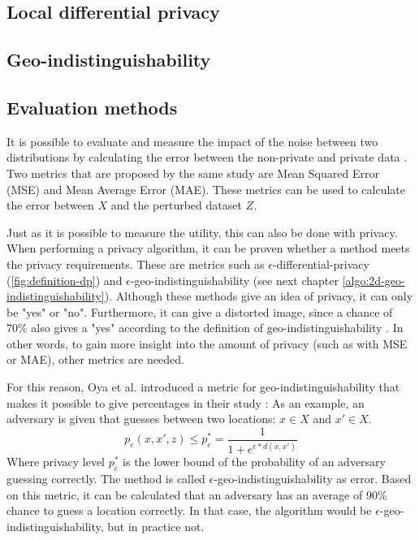 \subsection{Local differential privacy}
\subsection{Geo-indistinguishability}

\subsection{Evaluation methods} \label{theory:evaluation-dp}
It is possible to evaluate and measure the impact of the noise between two distributions by calculating the error between the non-private and private data \citep{del_rey_comprehensive_2020-1}.
Two metrics that are proposed by the same study are Mean Squared Error (MSE) and Mean Average Error (MAE).
These metrics can be used to calculate the error between $X$ and the perturbed dataset $Z$. \newline

Just as it is possible to measure the utility, this can also be done with privacy.
When performing a privacy algorithm, it can be proven whether a method meets the privacy requirements.
These are metrics such as $\epsilon$-differential-privacy (\ref{fig:definition-dp}) and $\epsilon$-geo-indistinguishability (see next chapter \ref{algo:2d-geo-indistinguishability}).
Although these methods give an idea of privacy, it can only be "yes" or "no".
Furthermore, it can give a distorted image, since a chance of 70\% also gives a "yes" according to the definition of geo-indistinguishability \citep{oya_is_2017}.
In other words, to gain more insight into the amount of privacy (such as with MSE or MAE), other metrics are needed.

For this reason, Oya et al. introduced a metric for geo-indistinguishability that makes it possible to give percentages in their study \citep{oya_is_2017}:
As an example, an adversary is given that guesses between two locations: $x \in X$ and  $x' \in X$.
\begin{equation}
  p_e (x, x', z) \leq p^*_e = \frac{1}{1 + e^{e * d(x, x')}}
  \label{eq:geo-as-an-error}
\end{equation}
Where privacy level $p^*_e$ is the lower bound of the probability of an adversary guessing correctly.
The method is called $\epsilon$-geo-indistinguishability as error.
Based on this metric, it can be calculated that an adversary has an average of 90\% chance to guess a location correctly.
In that case, the algorithm would be $\epsilon$-geo-indistinguishability, but in practice not.